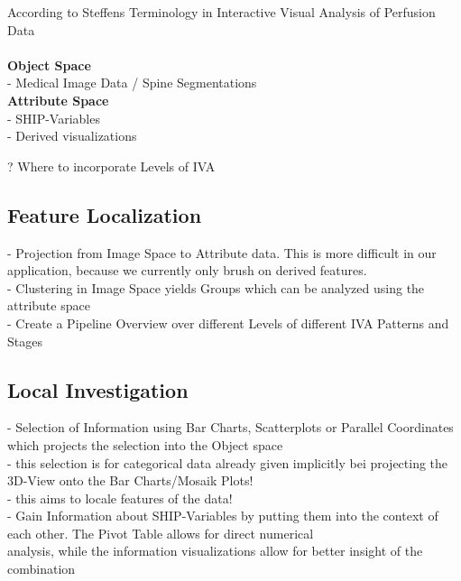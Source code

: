 \documentclass[journal]{style/vgtc}           %
\begin{document}
According to Steffens Terminology in Interactive Visual Analysis of Perfusion Data
\\\\
\textbf{Object Space}\\
- Medical Image Data / Spine Segmentations\\
\textbf{Attribute Space}\\
- SHIP-Variables\\
- Derived visualizations

? Where to incorporate Levels of IVA

\subsection{Feature Localization}
- Projection from Image Space to Attribute data. This is more difficult in our application, because we currently only brush on derived features.\\
- Clustering in Image Space yields Groups which can be analyzed using the attribute space\\
- Create a Pipeline Overview over different Levels of different IVA Patterns and Stages

\subsection{Local Investigation}
- Selection of Information using Bar Charts, Scatterplots or Parallel Coordinates which projects the selection into the Object space\\
- this selection is for categorical data already given implicitly bei projecting the 3D-View onto the Bar Charts/Mosaik Plots!\\
- this aims to locale features of the data!\\
- Gain Information about SHIP-Variables by putting them into the context of each other. The Pivot Table allows for direct numerical\\ analysis, while the information visualizations allow for better insight of the combination
\end{document}
